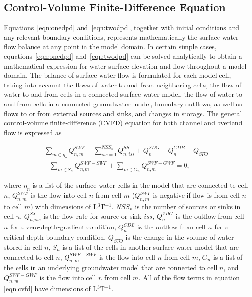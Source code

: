 \documentclass[fleqn]{article}
\begin{document}
\subsection{Control-Volume Finite-Difference Equation}
Equations~\ref{eqn:onedpd} and~\ref{eqn:twodpd}, together with initial conditions and any relevant boundary conditions, represents mathematically the surface water flow balance at any point in the model domain. In certain simple cases, equations~\ref{eqn:onedpd} and~\ref{eqn:twodpd} can be solved analytically to obtain a mathematical expression for water surface elevation and flow throughout a model domain. The balance of surface water flow is formulated for each model cell, taking into account the flows of water to and from neighboring cells, the flow of water to and from cells in a connected surface water model, the flow of water to and from cells in a connected groundwater model, boundary outflows, as well as flows to or from external sources and sinks, and changes in storage.  The general control-volume finite-difference (CVFD) equation for both channel and overland flow is expressed as

\begin{equation}
  \label{eqn:cvfd}
  \begin{split}
  \sum \limits_{m \in \eta_{n}} Q_{n,m}^{SWF}
  + \sum \limits_{iss=1}^{NSS_n} Q_{n,iss}^{SS}
  + Q_n^{ZDG}
  + Q_n^{CDB}
  - Q_{STO} \\
  + \sum \limits_{m \in S_{n}} Q_{n,m}^{SWF-SWF}
  + \sum \limits_{m \in G_{n}} Q_{n,m}^{SWF-GWF}
  = 
  0,
  \end{split}
\end{equation}

\noindent where 
$\eta_{n}$ is a list of the surface water cells in the model that are connected to cell $n$, 
$Q_{n,m}^{SWF}$ is the flow into cell $n$ from cell $m$ ($Q_{n,m}^{SWF}$ is negative if flow is from cell $n$ to cell $m$) with dimensions of L$^{3}$T$^{-1}$, 
$NSS_n$ is the number of sources or sinks in cell $n$, $Q_{n,iss}^{SS}$ is the flow rate for source or sink $iss$, 
$Q_n^{ZDG}$ is the outflow from cell $n$ for a zero-depth-gradient condition, 
$Q_n^{CDB}$ is the outflow from cell $n$ for a critical-depth-boundary condition,
$Q_{STO}$ is the change in the volume of water stored in cell $n$,
$S_{n}$ is a list of the cells in another surface water model that are connected to cell $n$,
$Q_{n,m}^{SWF-SWF}$ is the flow into cell $n$ from cell $m$, 
$G_{n}$ is a list of the cells in an underlying groundwater model that are connected to cell $n$,
and $Q_{n,m}^{SWF-GWF}$ is the flow into cell $n$ from cell $m$.  
All of the flow terms in equation \ref{eqn:cvfd} have dimensions of L$^{3}$T$^{-1}$.
\end{document}
